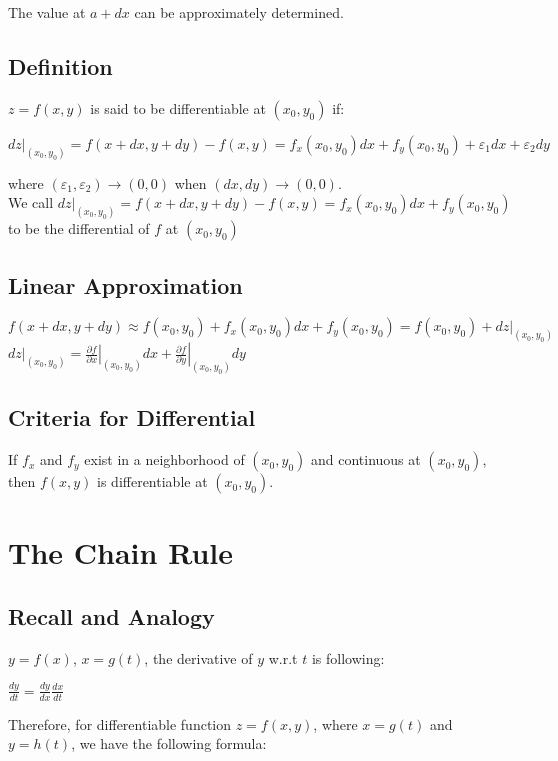 \documentclass[UTF8,a4paper, 10pt, openany]{svmono}
\begin{document}
The value at $a+dx$ can be approximately determined.
\subsection{Definition}
$z=f(x,y)$ is said to be differentiable at $(x_0,y_0)$ if:

\begin{center}
$dz|_{(x_0,y_0)}=f(x+dx,y+dy)-f(x,y)=f_x(x_0,y_0)dx+f_y(x_0,y_0)+\varepsilon_1dx+\varepsilon_2dy$
\end{center}

where $(\varepsilon_1,\varepsilon_2)\to (0,0)$ when $(dx,dy)\to (0,0)$.\\

We call $dz|_{(x_0,y_0)}=f(x+dx,y+dy)-f(x,y)=f_x(x_0,y_0)dx+f_y(x_0,y_0)$ to be the differential of $f$ at $(x_0,y_0)$
\subsection{Linear Approximation}
\begin{center}
$f(x+dx,y+dy)\approx f(x_0,y_0)+f_x(x_0,y_0)dx+f_y(x_0,y_0)=f(x_0,y_0)+dz|_{(x_0,y_0)}$\\
$dz|_{(x_0,y_0)}=\left. \frac{\partial f}{\partial x} \right|_{(x_0,y_0)}dx + 	\left.\frac{\partial f}{\partial y} \right|_{(x_0,y_0)}dy$
\end{center}
\subsection{Criteria for Differential}
If $f_x$ and $f_y$ exist in a neighborhood of $(x_0,y_0)$ and continuous at $(x_0,y_0)$, then $f(x,y)$ is differentiable at $(x_0,y_0)$.

\section{The Chain Rule}
\subsection{Recall and Analogy}
$y=f(x)$, $x=g(t)$, the derivative of $y$ w.r.t $t$ is following:

\begin{center}
$\frac{dy}{dt}=\frac{dy}{dx}\frac{dx}{dt}$
\end{center}

Therefore, for differentiable function $z=f(x,y)$, where $x=g(t)$ and $y=h(t)$, we have the following formula:
\end{document}

